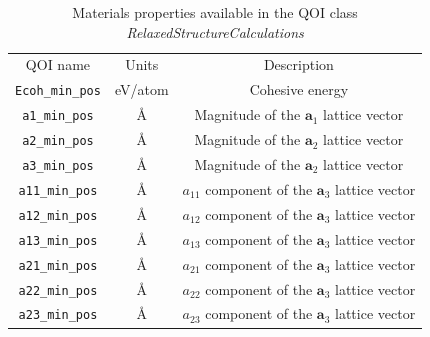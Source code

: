 \begin{table}[ht]
	\centering
	\caption{Materials properties available in the QOI class \emph{RelaxedStructureCalculations}}
	\label{tbl:pypospack_qoi_lmps_min_all}
	\begin{tabular}{ccc}
		\hline
		QOI name & Units & Description \\
		\verb|Ecoh_min_pos|
			& eV/atom
			& Cohesive energy\\
		\verb|a1_min_pos|
			& \AA
			& Magnitude of the $\bm{a}_1$ lattice vector \\
		\verb|a2_min_pos|
			& \AA
			& Magnitude of the $\bm{a}_2$ lattice vector \\
		\verb|a3_min_pos|
			& \AA
			& Magnitude of the $\bm{a}_2$ lattice vector \\
		\verb|a11_min_pos|
			& \AA
			& $a_{11}$ component of the $\bm{a}_3$ lattice vector \\
		\verb|a12_min_pos|
			& \AA
			& $a_{12}$ component of the $\bm{a}_3$ lattice vector \\
		\verb|a13_min_pos|
			& \AA
			& $a_{13}$ component of the $\bm{a}_3$ lattice vector \\
		\verb|a21_min_pos|
			& \AA
			& $a_{21}$ component of the $\bm{a}_3$ lattice vector \\
		\verb|a22_min_pos|
			& \AA
			& $a_{22}$ component of the $\bm{a}_3$ lattice vector \\
		\verb|a23_min_pos|
			& \AA
			& $a_{23}$ component of the $\bm{a}_3$ lattice vector \\
		\hline
	\end{tabular}
\end{table}

